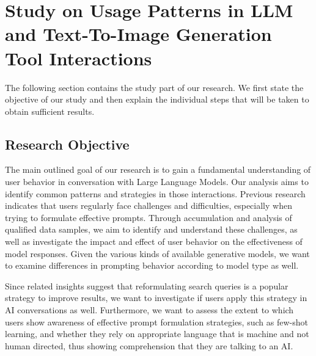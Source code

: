 \usepackage{hyperref}%
\section{Study on Usage Patterns in LLM and Text-To-Image Generation Tool Interactions}
\label{sec:study-on-usage-patterns-in-llm-and-text-to-image-generation-tool-interactions}
The following section contains the study part of our research.
We first state the objective of our study and then explain the individual steps that will be
taken to obtain sufficient results.
\subsection{Research Objective}
\label{subsec:research-objective}
The main outlined goal of our research is to gain a fundamental understanding of user behavior in conversation with Large Language Models.
Our analysis aims to identify common patterns and strategies in those interactions.
Previous research indicates that users regularly face challenges and difficulties, especially
when trying to formulate effective prompts.
Through accumulation and analysis of qualified data samples, we aim to identify and understand these
challenges,
as well as investigate the impact and effect of user behavior on the effectiveness of model
responses.
Given the various kinds of available generative models, we want to examine differences in
prompting behavior according to model type as well.

Since related insights suggest that reformulating search queries is a popular strategy to improve
results, we want to investigate if users apply this strategy in AI conversations as well.
Furthermore, we want to assess the extent to which users show awareness of effective prompt
formulation strategies, such as few-shot learning, and whether they rely on appropriate language
that is machine and not human directed, thus showing comprehension that they are talking to an AI\@.

